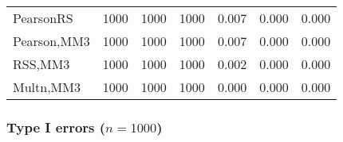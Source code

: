 \documentclass[
]{article}
\begin{document}
\begin{table}[H]
{\begin{tabular}[t]{lrrrrrr}
\hspace{1em}PearsonRS & 1000 & 1000 & 1000 & 0.007 & 0.000 & 0.000\\
\hspace{1em}Pearson,MM3 & 1000 & 1000 & 1000 & 0.007 & 0.000 & 0.000\\
\hspace{1em}RSS,MM3 & 1000 & 1000 & 1000 & 0.002 & 0.000 & 0.000\\
\hspace{1em}Multn,MM3 & 1000 & 1000 & 1000 & 0.000 & 0.000 & 0.000\\
\bottomrule
\end{tabular}}
\end{table}

\hypertarget{type-i-errors-n1000-2}{%
\subsubsection{\texorpdfstring{Type I errors
(\(n=1000\))}{Type I errors (n=1000)}}\label{type-i-errors-n1000-2}}
\end{document}

